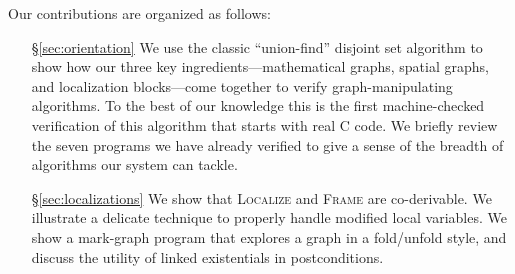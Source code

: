 Our contributions are organized as follows:
\begin{itemize}
\item[\S\ref{sec:orientation}] We use the classic ``union-find'' disjoint set algorithm to show how our three key ingredients---mathematical graphs, spatial graphs, and localization blocks---come together to verify
graph-manipulating algorithms.
To the best of our knowledge this is the first machine-checked verification of this algorithm that starts with real C code.
We briefly review the seven programs we have already verified to give a sense 
of the breadth of algorithms our system can tackle.
\item[\S\ref{sec:localizations}] We show that \textsc{Localize} and \textsc{Frame} are co-derivable.  We illustrate a delicate technique to properly handle modified 
local variables. We show a mark-graph
program that explores a graph in a fold/unfold style, and discuss the utility of linked
existentials in postconditions.  


\end{itemize}
